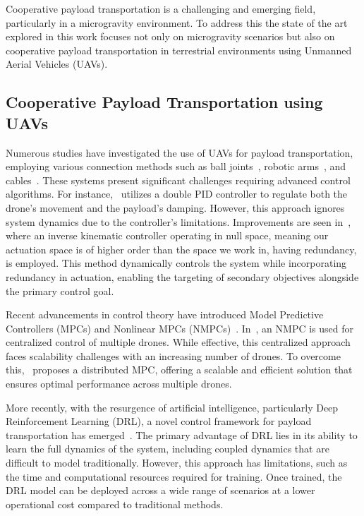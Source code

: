 Cooperative payload transportation is a challenging and emerging field, particularly in a microgravity environment. To address this the state of the art explored in this work focuses not only on microgravity scenarios but also on cooperative payload transportation in terrestrial environments using Unmanned Aerial Vehicles (UAVs).


\subsection{Cooperative Payload Transportation using UAVs}
Numerous studies have investigated the use of UAVs for payload transportation, employing various connection methods such as ball joints~\cite{tagliabue2019robust,loianno2018localization}, robotic arms~\cite{lee2020visual,ouyang2021control}, and cables~\cite{li2021design,klausen2018cooperative,li2023nonlinear}. These systems present significant challenges requiring advanced control algorithms. For instance,~\cite{dhiman2018cooperative} utilizes a double PID controller to regulate both the drone’s movement and the payload’s damping. However, this approach ignores system dynamics due to the controller's limitations. Improvements are seen in~\cite{gimenez2018multi}, where an inverse kinematic controller operating in null space, meaning our actuation space is of higher order than the space we work in, having redundancy, is employed. This method dynamically controls the system while incorporating redundancy in actuation, enabling the targeting of secondary objectives alongside the primary control goal.

Recent advancements in control theory have introduced Model Predictive Controllers (MPCs) and Nonlinear MPCs (NMPCs)~\cite{li2023nonlinear,wehbeh2020distributed}. In~\cite{li2023nonlinear}, an NMPC is used for centralized control of multiple drones. While effective, this centralized approach faces scalability challenges with an increasing number of drones. To overcome this,~\cite{wehbeh2020distributed} proposes a distributed MPC, offering a scalable and efficient solution that ensures optimal performance across multiple drones. 

More recently, with the resurgence of artificial intelligence, particularly Deep Reinforcement Learning (DRL), a novel control framework for payload transportation has emerged~\cite{panetsos2022deep,lin2023payload, belkhale2021model}. The primary advantage of DRL lies in its ability to learn the full dynamics of the system, including coupled dynamics that are difficult to model traditionally. However, this approach has limitations, such as the time and computational resources required for training. Once trained, the DRL model can be deployed across a wide range of scenarios at a lower operational cost compared to traditional methods.

